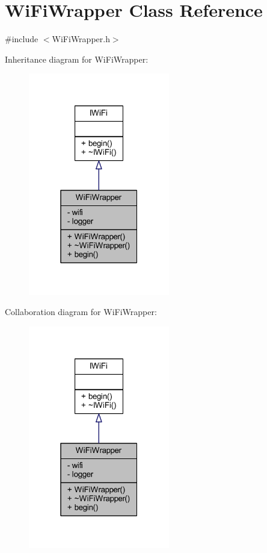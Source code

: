 \hypertarget{class_wi_fi_wrapper}{}\section{Wi\+Fi\+Wrapper Class Reference}
\label{class_wi_fi_wrapper}


{\ttfamily \#include $<$Wi\+Fi\+Wrapper.\+h$>$}



Inheritance diagram for Wi\+Fi\+Wrapper\+:
\nopagebreak
\begin{figure}[H]
\begin{center}
\leavevmode
\includegraphics[width=175pt]{class_wi_fi_wrapper__inherit__graph}
\end{center}
\end{figure}


Collaboration diagram for Wi\+Fi\+Wrapper\+:
\nopagebreak
\begin{figure}[H]
\begin{center}
\leavevmode
\includegraphics[width=175pt]{class_wi_fi_wrapper__coll__graph}
\end{center}
\end{figure}
